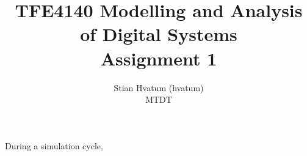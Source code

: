 \documentclass[english,a4paper]{report}
\title{TFE4140 Modelling and Analysis of Digital Systems\\
\Huge Assignment 1}
\author{Stian Hvatum (hvatum)\\MTDT}
\begin{document}
\maketitle
\tableofcontents
\newpage
\section{}
\subsection{}
\subsection{}
During a simulation cycle, 
\end{document}
